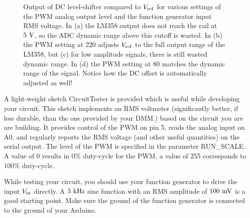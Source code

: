 \documentclass[12pt]{article}
\begin{document}
\begin{figure}[htbp]
\begin{center}
\begin{tabular}{cc}
\end{tabular}
\end{center}
\caption{\label{fig:pwmdemo}  
Output of DC level-shifter compared to $V_{\rm ref}$ for various settings of the PWM analog output level
 and the function generator input RMS voltage.  In (a) the LM358 output does not reach the rail at 
 $5~\rm V$, so the ADC dynamic range above this cutoff is wasted.  In (b) the PWM setting at 220 adjusts $V_{\rm ref}$ to the full output range of the LM358, but (c) for low amplitude signals,
there is still wasted dynamic range.  In (d) the PWM setting at 80 matches the dynamic range of the signal.  Notice how the DC offset is automatically adjusted as well!
}
\end{figure}


A light-weight sketch {\rm CircuitTester} is provided which is useful while developing your circuit.  This sketch implements an RMS voltmeter (significantly better, if less durable, than the one provided by your DMM.) based on the circuit you are are building.  It provides control of the PWM on pin 5, reads the analog input on A0, and regularly reports the RMS voltage (and other useful quantities) on the serial output.
The level of the PWM is specified in the parameter {\rm RUN\_SCALE}.  A value of 0 results in $0\%$ duty-cycle for the PWM, a value of 255 corresponds to $100\%$ duty-cycle.

While testing your circuit, you should use your function generator to drive the input $V_{\rm in}$ directly.  A $5~\rm kHz$ sine function with an RMS amplitude of $100~\rm mV$ is a good starting point.  Make sure the ground of the function generator is connected to the ground of your Arduino.
\end{document}
